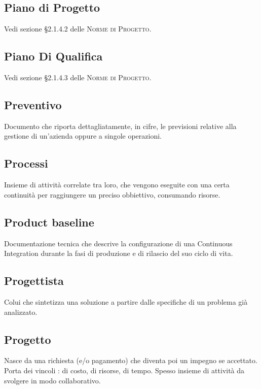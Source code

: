 \documentclass[../glossario.tex]{subfiles}
\begin{document}
\subsection*{Piano di Progetto}
Vedi sezione \S2.1.4.2 delle \textsc{Norme di Progetto}.

\subsection*{Piano Di Qualifica} 
Vedi sezione \S2.1.4.3 delle \textsc{Norme di Progetto}.

\subsection*{Preventivo}
Documento che riporta dettagliatamente, in cifre, le previsioni relative alla gestione di un'azienda oppure a singole operazioni.

\subsection*{Processi} 
Insieme di attività correlate tra loro, che vengono eseguite con una certa continuità per raggiungere un preciso obbiettivo, consumando risorse.

\subsection*{Product baseline} 
Documentazione tecnica che descrive la configurazione di una Continuous Integration durante la fasi di produzione e di rilascio del suo ciclo di vita.

\subsection*{Progettista} 
Colui che sintetizza una soluzione a partire dalle specifiche di un problema già analizzato.

\subsection*{Progetto} 
Nasce da una richiesta (e/o pagamento) che diventa poi un impegno se accettato. Porta dei vincoli : di costo, di risorse, di tempo. Spesso insieme di attività da svolgere in modo collaborativo.
\end{document}
